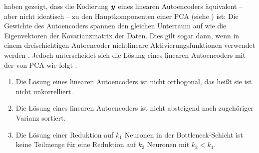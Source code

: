 \textcites{Baldi.1989}{Bourlard.1988} haben gezeigt, dass die Kodierung $\bm{y}$ eines linearen Autoencoders äquivalent -- aber nicht identisch -- zu den Hauptkomponenten einer PCA (siehe ) ist: Die Gewichte des Autoencoders spannen den gleichen Unterraum auf wie die Eigenvektoren der Kovarianzmatrix der Daten. Dies gilt sogar dann, wenn in einem dreischichtigen Autoencoder nichtlineare Aktivierungsfunktionen verwendet werden \parencite[291, 293]{Bourlard.1988}. Jedoch unterscheidet sich die Lösung eines linearen Autoencoders
mit der von PCA wie folgt \parencite[3]{Plaut.2018}:
\begin{enumerate}
	\item Die Lösung eines linearen Autoencoders ist nicht orthogonal, das heißt sie ist nicht unkorrelliert.
	\item Die Lösung eines linearen Autoencoders ist nicht absteigend nach zugehöriger Varianz sortiert.
	\item Die Lösung einer Reduktion auf $k_1$ Neuronen in der Bottleneck-Schicht ist keine Teilmenge für
	      eine Reduktion auf $k_2$ Neuronen mit $k_2 < k_1$.
\end{enumerate}
